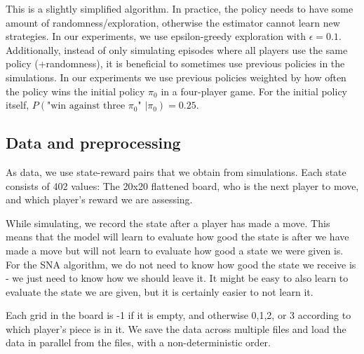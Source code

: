 \documentclass{article}
\begin{document}
This is a slightly simplified algorithm. In practice,
the policy needs to have some amount of randomness/exploration,
otherwise the estimator cannot learn new strategies.
In our experiments, we use epsilon-greedy exploration
with $\epsilon=0.1$.
Additionally, instead of only simulating episodes where
all players use the same policy (+randomness), it is
beneficial to sometimes use previous policies in the
simulations. In our experiments we use previous policies
weighted by how often the policy wins the initial policy
$\pi_0$ in a four-player game. For the initial policy itself,
$P(\text{"win against three } \pi_0 \text{" }| \pi_0) = 0.25$.

\subsection{Data and preprocessing}
\label{sec:data-prepocessing}
As data, we use state-reward pairs that we obtain from
simulations. Each state consists of 402 values: The 20x20
flattened board, who is the next player to move, and which
player's reward we are assessing.

While simulating, we record the state after a player has
made a move. This means that the model will learn to
evaluate how good the state is after we have made a move
but will not learn to evaluate how good a state we were
given is. For the SNA algorithm, we do not need to know
how good the state we receive is - we just need to know
how we should leave it. It might be easy to also learn to
evaluate the state we are given, but it is certainly easier
to not learn it.

Each grid in the board is -1 if it is empty, and otherwise
0,1,2, or 3 according to which player's piece is in it.
We save the data across multiple files and load the data
in parallel from the files, with a non-deterministic order.
\end{document}
